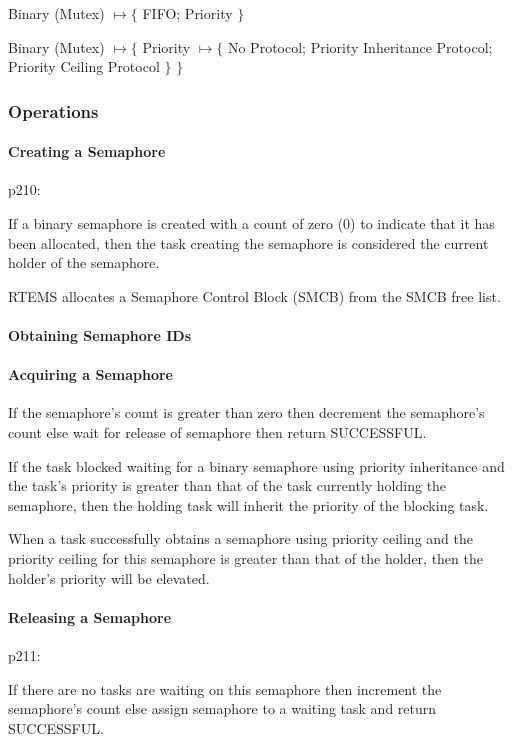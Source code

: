 Binary (Mutex)
$\mapsto \{$
 FIFO; Priority
$\}$

Binary (Mutex)
$\mapsto \{$
 Priority
 $\mapsto \{$
   No Protocol; Priority Inheritance Protocol; Priority Ceiling Protocol
 $\}$
$\}$

\subsubsection{Operations}

\paragraph{Creating a Semaphore}

p210:

If a binary semaphore is created with a count of zero (0)
to indicate that it has been allocated,
then the task creating the semaphore
is considered the current holder of the semaphore.

RTEMS allocates a Semaphore Control Block (SMCB) from the SMCB free list.

\paragraph{Obtaining Semaphore IDs}

\paragraph{Acquiring a Semaphore}

If the semaphore’s count is greater than zero
then decrement the semaphore’s count
else wait for release of semaphore then return SUCCESSFUL.

If the task blocked waiting for a binary semaphore
using priority inheritance
and the task’s priority is greater than that of
the task currently holding the semaphore,
then the holding task will inherit the priority of the blocking task.

When a task successfully obtains a semaphore using priority ceiling
and the priority ceiling for this semaphore is greater than that of the holder,
then the holder’s priority will be elevated.

\paragraph{Releasing a Semaphore}

p211:

If there are no tasks are waiting on this semaphore
then increment the semaphore’s count
else assign semaphore to a waiting task and return SUCCESSFUL.

